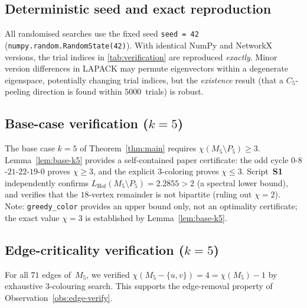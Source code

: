 \documentclass[11pt,a4paper]{amsart}
\theoremstyle{plain}
\theoremstyle{definition}
\theoremstyle{remark}
\newcommand{\chr}{\chi}
\newcommand{\LHof}{L_{\mathrm{Hof}}}
\begin{document}
\subsection{Deterministic seed and exact reproduction}

All randomised searches use the fixed seed \texttt{seed\,=\,42}
(\texttt{numpy.random.RandomState(42)}).  With identical NumPy and NetworkX
versions, the trial indices in \cref{tab:verification} are reproduced
\emph{exactly}.  Minor version differences in LAPACK may permute eigenvectors
within a degenerate eigenspace, potentially changing trial indices, but the
\emph{existence} result (that a $C_5$-peeling direction is found within
$5000$~trials) is robust.

\subsection{Base-case verification ($k = 5$)}

The base case $k = 5$ of Theorem~\ref{thm:main} requires
$\chr(M_5 \setminus P_5) \geq 3$.  Lemma~\ref{lem:base-k5} provides a
self-contained paper certificate: the odd cycle $0$-$8$-$21$-$22$-$19$-$0$
proves $\chr \geq 3$, and the explicit $3$-coloring proves $\chr \leq 3$.
Script~\textbf{S1} independently confirms $\LHof(M_5 \setminus P_5) = 2.2855 > 2$
(a spectral lower bound), and verifies that the $18$-vertex remainder is not
bipartite (ruling out $\chr = 2$).  Note: \texttt{greedy\_color} provides an
upper bound only, not an optimality certificate; the exact value $\chr = 3$ is
established by Lemma~\ref{lem:base-k5}.

\subsection{Edge-criticality verification ($k = 5$)}

For all $71$ edges of~$M_5$, we verified
$\chr(M_5 - \{u,v\}) = 4 = \chr(M_5) - 1$ by exhaustive
$3$-colouring search.  This supports the edge-removal property of
Observation~\ref{obs:edge-verify}.
\end{document}
